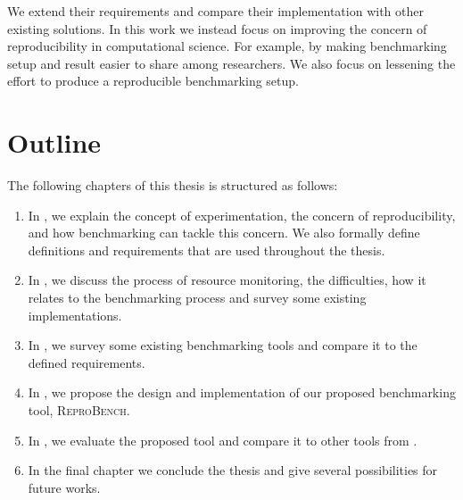We extend their requirements and compare their implementation with other existing solutions.
In this work we instead focus on improving the concern of reproducibility in computational science.
For example, by making benchmarking setup and result easier to share among researchers.
We also focus on lessening the effort to produce a reproducible benchmarking setup.


\section{Outline}
\label{sec:intro.outline}

The following chapters of this thesis is structured as follows:

\begin{enumerate}
	\item In , we explain the concept of experimentation, the concern of reproducibility, and how benchmarking can tackle this concern. We also formally define definitions and requirements that are used throughout the thesis.
	\item In , we discuss the process of resource monitoring, the difficulties, how it relates to the benchmarking process and survey some existing implementations.
	\item In , we survey some existing benchmarking tools and compare it to the defined requirements.
	\item In , we propose the design and implementation of our proposed benchmarking tool, \textsc{ReproBench}.
	\item In , we evaluate the proposed tool and compare it to other tools from .
	\item In the final chapter we conclude the thesis and give several possibilities for future works.
\end{enumerate}
